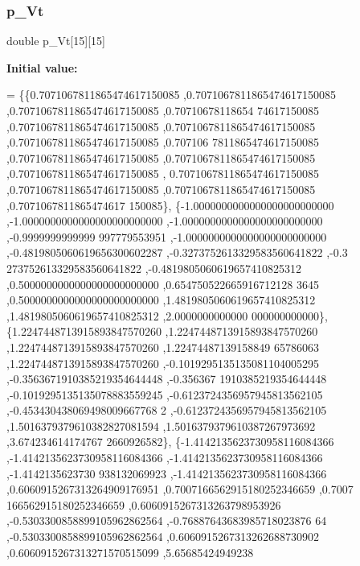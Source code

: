 \mbox{\label{a00455_ad9a2c45bfc226ffd0ecc95759f0ae1c1}} 
\subsubsection{\texorpdfstring{p\+\_\+\+Vt}{p\_Vt}}
{\footnotesize\ttfamily double p\+\_\+\+Vt\mbox{[}15\mbox{]}\mbox{[}15\mbox{]}}

{\bfseries Initial value\+:}
\begin{DoxyCode}
= \{\{0.7071067811865474617150085 ,0.7071067811865474617150085 ,0.7071067811865474617150085 ,0.70710678118654
      74617150085 ,0.7071067811865474617150085 ,0.7071067811865474617150085 ,0.7071067811865474617150085 ,0.707106
      7811865474617150085 ,0.7071067811865474617150085 ,0.7071067811865474617150085 ,0.7071067811865474617150085 ,
      0.7071067811865474617150085 ,0.7071067811865474617150085 ,0.7071067811865474617150085 ,0.7071067811865474617
      150085\},
\{-1.0000000000000000000000000 ,-1.0000000000000000000000000 ,-1.0000000000000000000000000 ,-0.9999999999999
      997779553951 ,-1.0000000000000000000000000 ,-0.4819805060619656300602287 ,-0.3273752613329583560641822 ,-0.3
      273752613329583560641822 ,-0.4819805060619657410825312 ,0.5000000000000000000000000 ,0.654750522665916712128
      3645 ,0.5000000000000000000000000 ,1.4819805060619657410825312 ,1.4819805060619657410825312 ,2.0000000000000
      000000000000\},
\{1.2247448713915893847570260 ,1.2247448713915893847570260 ,1.2247448713915893847570260 ,1.22474487139158849
      65786063 ,1.2247448713915893847570260 ,-0.1019295135135081104005295 ,-0.3563671910385219354644448 ,-0.356367
      1910385219354644448 ,-0.1019295135135078883559245 ,-0.6123724356957945813562105 ,-0.453430438069498009667768
      2 ,-0.6123724356957945813562105 ,1.5016379379610382827081594 ,1.5016379379610387267973692 ,3.674234614174767
      2660926582\},
\{-1.4142135623730958116084366 ,-1.4142135623730958116084366 ,-1.4142135623730958116084366 ,-1.4142135623730
      938132069923 ,-1.4142135623730958116084366 ,0.6060915267313264909176951 ,0.7007166562915180252346659 ,0.7007
      166562915180252346659 ,0.6060915267313263798953926 ,-0.5303300858899105962862564 ,-0.76887643683985718023876
      64 ,-0.5303300858899105962862564 ,0.6060915267313262688730902 ,0.6060915267313271570515099 ,5.65685424949238

\end{DoxyCode}
